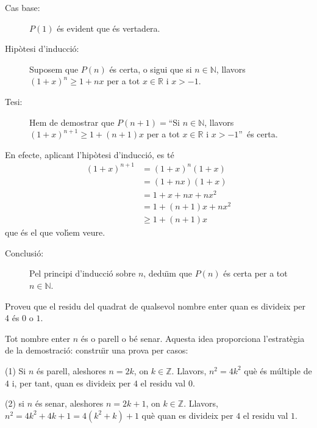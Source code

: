 \begin{solucio}
\begin{description}
\item[Cas base:] $P(1)$ \'{e}s evident que \'{e}s vertadera.

\item[Hip\`{o}tesi d'inducci\'{o}:] Suposem que $P(n)$ \'{e}s certa, o sigui
que si $n\in\mathbb{N}$, llavors $\left(  1+x\right)  ^{n}\geq1+nx$ per a tot
$x\in\mathbb{R}$ i $x>-1$.

\item[Tesi:] Hem de demostrar que $P(n+1)=$\textquotedblleft Si $n\in
\mathbb{N}$, llavors $\left(  1+x\right)  ^{n+1}\geq1+(n+1)x$ per a tot
$x\in\mathbb{R}$ i $x>-1$\textquotedblright\ \'{e}s certa.
\end{description}

En efecte, aplicant l'hip\`{o}tesi d'inducci\'{o}, es t\'{e}%
\begin{align*}
\left(  1+x\right)  ^{n+1}  &  =(1+x)^{n}(1+x)\\
&  =\left(  1+nx\right)  (1+x)\\
&  =1+x+nx+nx^{2}\\
&  =1+(n+1)x+nx^{2}\\
&  \geq1+(n+1)x
\end{align*}
que \'{e}s el que vol\'{\i}em veure.

\begin{description}
\item[Conclusi\'{o}:] Pel principi d'inducci\'{o} sobre $n$, dedu\"{\i}m que
$P(n)$ \'{e}s certa per a tot $n\in\mathbb{N}$.
\end{description}
\end{solucio}

\begin{exer}
Proveu que el residu del quadrat de qualsevol nombre enter quan es divideix
per 4 \'{e}s $0$ o $1$.
\end{exer}

\begin{solucio}
Tot nombre enter $n$ \'{e}s o parell o b\'{e} senar. Aquesta idea proporciona
l'estrat\`{e}gia de la demostraci\'{o}: constru\"{\i}r una prova per casos:

(1) Si $n$ \'{e}s parell, aleshores $n=2k$, on $k\in\mathbb{Z}$. Llavors,
$n^{2}=4k^{2}$ qu\`{e} \'{e}s m\'{u}ltiple de $4$ i, per tant, quan es
divideix per $4$ el residu val $0$.

(2) si $n$ \'{e}s senar, aleshores $n=2k+1$, on $k\in\mathbb{Z}$. Llavors,
$n^{2}=4k^{2}+4k+1=4\left(  k^{2}+k\right)  +1$ qu\`{e} quan es divideix per
$4$ el residu val $1$.
\end{solucio}

